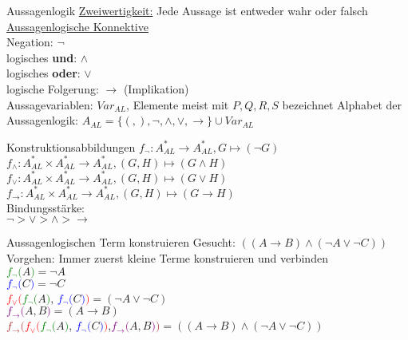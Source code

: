 \begin{frame}{Aussagenlogik}
	\underline{Zweiwertigkeit:} Jede Aussage ist entweder wahr oder falsch\\
	\underline{Aussagenlogische Konnektive}\\
	Negation: $\neg$\\
	logisches \textbf{und}: $\wedge$\\
	logisches \textbf{oder}: $\vee$\\
	logische Folgerung: $\rightarrow$ (Implikation)\\
	Aussagevariablen: $Var_{AL}$, Elemente meist mit $P, Q, R, S$ bezeichnet
	Alphabet der Aussagenlogik: $A_{AL}=\{(,),\neg,\wedge,\vee,\rightarrow\}\cup Var_{AL}$\\
\end{frame}

\begin{frame}{Konstruktionsabbildungen}
	$f_{\neg}: A^{\ast}_{AL}\longrightarrow A^{\ast}_{AL}, G\mapsto (\neg G)$\\
	$f_{\wedge}:A^{\ast}_{AL}\times A^{\ast}_{AL}\longrightarrow A^{\ast}_{AL}, (G, H)\mapsto (G\wedge H)$\\
	$f_{\vee}:A^{\ast}_{AL}\times A^{\ast}_{AL}\longrightarrow A^{\ast}_{AL}, (G, H)\mapsto (G\vee H)$\\
	$f_{\rightarrow}:A^{\ast}_{AL}\times A^{\ast}_{AL}\longrightarrow A^{\ast}_{AL}, (G, H)\mapsto (G\rightarrow H)$\\
	Bindungsstärke:\\
	$\neg>\vee>\wedge>\rightarrow$\\
\end{frame}

\begin{frame}{Aussagenlogischen Term konstruieren}
	Gesucht: $((A\rightarrow B)\wedge (\neg A\vee\neg C))$\\
	Vorgehen: Immer zuerst kleine Terme konstruieren und verbinden\\
	\textcolor{green}{$f_{\neg} ($}$A$\textcolor{green}{$)$}$ = \neg A$\\
	\textcolor{blue}{$f_{\neg}($}$C$\textcolor{blue}{$)$}$ = \neg C$\\
	\textcolor{red}{$f_{\vee}($}\textcolor{green}{$f_{\neg} ($}$A$\textcolor{green}{$)$}, \textcolor{blue}{$f_{\neg}($}$C$\textcolor{blue}{$)$}\textcolor{red}{$)$}$ = (\neg A\vee\neg C)$\\
	\textcolor{purple}{$f_{\rightarrow}($}$A,B$\textcolor{purple}{$)$}$ = (A\rightarrow B)$\\
	\textcolor{brown}{$f_{\rightarrow}($}\textcolor{red}{$f_{\vee}($}\textcolor{green}{$f_{\neg} ($}$A$\textcolor{green}{$)$}, \textcolor{blue}{$f_{\neg}($}$C$\textcolor{blue}{$)$}\textcolor{red}{$)$},\textcolor{purple}{$f_{\rightarrow}($}$A,B$\textcolor{purple}{$)$}\textcolor{brown}{$)$}$ = ((A\rightarrow B)\wedge (\neg A\vee\neg C))$\\
\end{frame}

